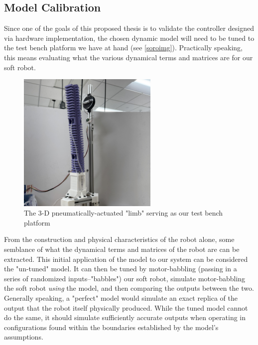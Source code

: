 \subsection{Model Calibration}
Since one of the goals of this proposed thesis is to validate the controller designed via hardware implementation, the chosen dynamic model will need to be tuned to the test bench platform we have at hand (see \autoref{soroimg}). Practically speaking, this means evaluating what the various dynamical terms and matrices are for our soft robot.

\begin{figure}[!ht]
    \centering
    \includegraphics[width=0.6\textwidth]{graphics/limb.jpg}
    \caption{The 3-D pneumatically-actuated "limb" serving as our test bench platform}
    \label{soroimg}
\end{figure}

From the construction and physical characteristics of the robot alone, some semblance of what the dynamical terms and matrices of the robot are can be extracted. This initial application of the model to our system can be considered the "un-tuned" model. It can then be tuned by motor-babbling (passing in a series of randomized inputs--"babbles") our soft robot, simulate motor-babbling the soft robot \textit{using} the model, and then comparing the outputs between the two. Generally speaking, a "perfect" model would simulate an exact replica of the output that the robot itself physically produced. While the tuned model cannot do the same, it should simulate sufficiently accurate outputs when operating in configurations found within the boundaries established by the model's assumptions.

